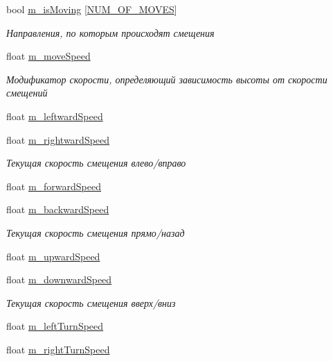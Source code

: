 \begin{DoxyCompactItemize}
bool \hyperlink{class_position_class_ab60b9c377f649dd1056d675892827628}{m\+\_\+is\+Moving} \mbox{[}\hyperlink{_position_class_8h_a7e6f6ecb4b80834476cbb67e51a918d5}{N\+U\+M\+\_\+\+O\+F\+\_\+\+M\+O\+V\+ES}\mbox{]}
\begin{DoxyCompactList}\small\item\em Направления, по которым происходят смещения \end{DoxyCompactList}\item 
float \hyperlink{class_position_class_a9114107a26907652defd68fbb53dd349}{m\+\_\+move\+Speed}
\begin{DoxyCompactList}\small\item\em Модификатор скорости, определяющий зависимость высоты от скорости смещений \end{DoxyCompactList}\item 
float \hyperlink{class_position_class_abbbf26ad76dcafa2db2bfb1e01d62e8b}{m\+\_\+leftward\+Speed}
\item 
float \hyperlink{class_position_class_a02d8de811a5f2327fbde7163cdcd37ba}{m\+\_\+rightward\+Speed}
\begin{DoxyCompactList}\small\item\em Текущая скорость смещения влево/вправо \end{DoxyCompactList}\item 
float \hyperlink{class_position_class_a79d96ce3323c65c045c60e7ef6c548ae}{m\+\_\+forward\+Speed}
\item 
float \hyperlink{class_position_class_a924a1e9210ce92204220ff25c56ee9b8}{m\+\_\+backward\+Speed}
\begin{DoxyCompactList}\small\item\em Текущая скорость смещения прямо/назад \end{DoxyCompactList}\item 
float \hyperlink{class_position_class_af0324bb22bef036aff2374066fdd6a3b}{m\+\_\+upward\+Speed}
\item 
float \hyperlink{class_position_class_a7047144c07127876870163d964778d19}{m\+\_\+downward\+Speed}
\begin{DoxyCompactList}\small\item\em Текущая скорость смещения вверх/вниз \end{DoxyCompactList}\item 
float \hyperlink{class_position_class_a11d92082c39a01a7e050c75ad287d414}{m\+\_\+left\+Turn\+Speed}
\item 
float \hyperlink{class_position_class_a045c4bb067c1219b6b65e3e6d723db84}{m\+\_\+right\+Turn\+Speed}

\end{DoxyCompactItemize}
